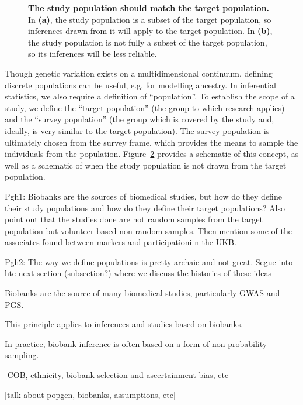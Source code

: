 \begin{figure}[h]
\begin{subfigure}{0.45\linewidth}
    \caption{}
    \label{fig:statistical_populations2}
\end{subfigure}
\caption[The relationship between target and study populations]{\textbf{The study population should match the target population.} In \textbf{(a)}, the study population is a subset of the target population, so inferences drawn from it will apply to the target population. In \textbf{(b)}, the study population is not fully a subset of the target population, so its inferences will be less reliable.}
\label{fig:statistical_populations}
\end{figure}

Though genetic variation exists on a multidimensional continuum, defining discrete populations can be useful, e.g. for modelling ancestry\citep{pritchard_inference_2000}. In inferential statistics, we also require a definition of ``population''\citep{statcan2003}. To establish the scope of a study, we define the ``target population'' (the group to which research applies) and the ``survey population'' (the group which is covered by the study and, ideally, is very similar to the target population). The survey population is ultimately chosen from the survey frame, which provides the means to sample the individuals from the population. Figure~\ref{fig:statistical_populations} provides a schematic of this concept, as well as a schematic of when the study population is not drawn from the target population.

Pgh1: Biobanks are the sources of biomedical studies, but how do they define their study populations and how do they define their target populations? Also point out that the studies done are not random samples from the target population but volunteer-based non-random samples. Then mention some of the associates found between markers and participationi n the UKB.

Pgh2: The way we define populations is pretty archaic and not great. Segue into hte next section (subsection?) where we discuss the histories of these ideas

Biobanks are the source of many biomedical studies, particularly GWAS and PGS. 

This principle applies to inferences and studies based on biobanks. 

In practice, biobank inference is often based on a form of non-probability sampling. 

-COB, ethnicity, biobank selection and ascertainment bias, etc

[talk about popgen, biobanks, assumptions, etc]


